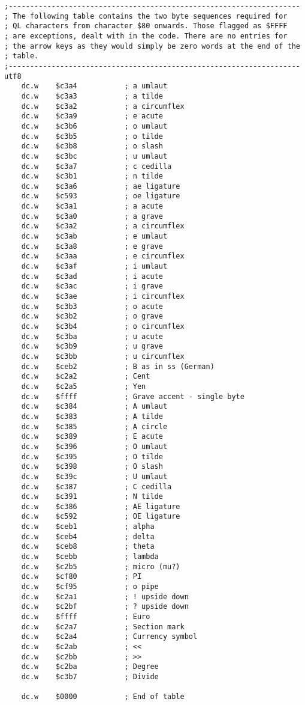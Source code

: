 \begin{lstlisting}[firstnumber=1, caption={Wolfgang's improved utf82ql Utility}]
;--------------------------------------------------------------------
; The following table contains the two byte sequences required for 
; QL characters from character $80 onwards. Those flagged as $FFFF 
; are exceptions, dealt with in the code. There are no entries for
; the arrow keys as they would simply be zero words at the end of the
; table.
;--------------------------------------------------------------------
utf8
    dc.w    $c3a4           ; a umlaut
    dc.w    $c3a3           ; a tilde
    dc.w    $c3a2           ; a circumflex
    dc.w    $c3a9           ; e acute
    dc.w    $c3b6           ; o umlaut
    dc.w    $c3b5           ; o tilde
    dc.w    $c3b8           ; o slash
    dc.w    $c3bc           ; u umlaut
    dc.w    $c3a7           ; c cedilla
    dc.w    $c3b1           ; n tilde
    dc.w    $c3a6           ; ae ligature
    dc.w    $c593           ; oe ligature
    dc.w    $c3a1           ; a acute
    dc.w    $c3a0           ; a grave
    dc.w    $c3a2           ; a circumflex
    dc.w    $c3ab           ; e umlaut
    dc.w    $c3a8           ; e grave
    dc.w    $c3aa           ; e circumflex
    dc.w    $c3af           ; i umlaut
    dc.w    $c3ad           ; i acute
    dc.w    $c3ac           ; i grave
    dc.w    $c3ae           ; i circumflex
    dc.w    $c3b3           ; o acute
    dc.w    $c3b2           ; o grave
    dc.w    $c3b4           ; o circumflex
    dc.w    $c3ba           ; u acute
    dc.w    $c3b9           ; u grave
    dc.w    $c3bb           ; u circumflex
    dc.w    $ceb2           ; B as in ss (German)
    dc.w    $c2a2           ; Cent
    dc.w    $c2a5           ; Yen
    dc.w    $ffff           ; Grave accent - single byte
    dc.w    $c384           ; A umlaut
    dc.w    $c383           ; A tilde
    dc.w    $c385           ; A circle
    dc.w    $c389           ; E acute
    dc.w    $c396           ; O umlaut
    dc.w    $c395           ; O tilde
    dc.w    $c398           ; O slash
    dc.w    $c39c           ; U umlaut
    dc.w    $c387           ; C cedilla
    dc.w    $c391           ; N tilde
    dc.w    $c386           ; AE ligature
    dc.w    $c592           ; OE ligature
    dc.w    $ceb1           ; alpha
    dc.w    $ceb4           ; delta
    dc.w    $ceb8           ; theta
    dc.w    $cebb           ; lambda
    dc.w    $c2b5           ; micro (mu?)
    dc.w    $cf80           ; PI
    dc.w    $cf95           ; o pipe
    dc.w    $c2a1           ; ! upside down
    dc.w    $c2bf           ; ? upside down
    dc.w    $ffff           ; Euro
    dc.w    $c2a7           ; Section mark
    dc.w    $c2a4           ; Currency symbol
    dc.w    $c2ab           ; <<
    dc.w    $c2bb           ; >>
    dc.w    $c2ba           ; Degree
    dc.w    $c3b7           ; Divide

    dc.w    $0000           ; End of table
\end{lstlisting}
